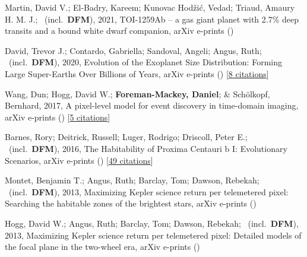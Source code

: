 \item[{\color{numcolor}\scriptsize6}] Martin, David V.; El-Badry, Kareem; Kunovac Hod{\v{z}}i{\'c}, Vedad; Triaud, Amaury H. M. J.; \etal\ (incl.\ \textbf{DFM}), 2021, TOI-1259Ab -- a gas giant planet with 2.7{\%} deep transits and a bound white dwarf companion, arXiv e-prints ()

\item[{\color{numcolor}\scriptsize5}] David, Trevor J.; Contardo, Gabriella; Sandoval, Angeli; Angus, Ruth; \etal\ (incl.\ \textbf{DFM}), 2020, Evolution of the Exoplanet Size Distribution: Forming Large Super-Earths Over Billions of Years, arXiv e-prints () [\href{https://ui.adsabs.harvard.edu/abs/2020arXiv201109894D}{8 citations}]

\item[{\color{numcolor}\scriptsize4}] Wang, Dun; Hogg, David W.; \textbf{Foreman-Mackey, Daniel}; \& Sch{\"o}lkopf, Bernhard, 2017, A pixel-level model for event discovery in time-domain imaging, arXiv e-prints () [\href{https://ui.adsabs.harvard.edu/abs/2017arXiv171002428W}{5 citations}]

\item[{\color{numcolor}\scriptsize3}] Barnes, Rory; Deitrick, Russell; Luger, Rodrigo; Driscoll, Peter E.; \etal\ (incl.\ \textbf{DFM}), 2016, The Habitability of Proxima Centauri b I: Evolutionary Scenarios, arXiv e-prints () [\href{https://ui.adsabs.harvard.edu/abs/2016arXiv160806919B}{49 citations}]

\item[{\color{numcolor}\scriptsize2}] Montet, Benjamin T.; Angus, Ruth; Barclay, Tom; Dawson, Rebekah; \etal\ (incl.\ \textbf{DFM}), 2013, Maximizing Kepler science return per telemetered pixel: Searching the habitable zones of the brightest stars, arXiv e-prints ()

\item[{\color{numcolor}\scriptsize1}] Hogg, David W.; Angus, Ruth; Barclay, Tom; Dawson, Rebekah; \etal\ (incl.\ \textbf{DFM}), 2013, Maximizing Kepler science return per telemetered pixel: Detailed models of the focal plane in the two-wheel era, arXiv e-prints ()